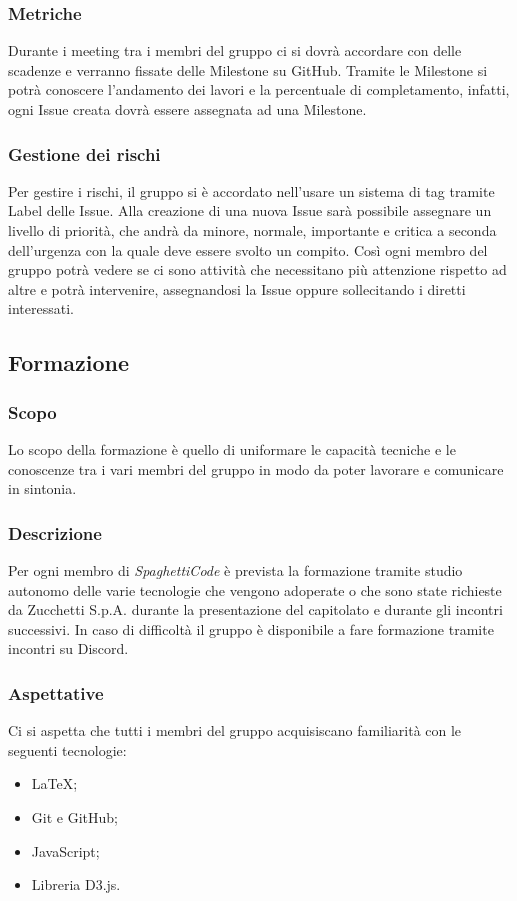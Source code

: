 \documentclass[../norme_di_progetto.tex]{subfiles}
\begin{document}
    \subsubsection{Metriche}
    Durante i meeting tra i membri del gruppo ci si dovrà accordare con delle scadenze e verranno fissate delle Milestone su GitHub. Tramite le Milestone si potrà conoscere l'andamento dei lavori e la percentuale di completamento, infatti, ogni Issue creata dovrà essere assegnata ad una Milestone. 
    \subsubsection{Gestione dei rischi}
    Per gestire i rischi, il gruppo si è accordato nell'usare un sistema di tag tramite Label delle Issue. Alla creazione di una nuova Issue sarà possibile assegnare un livello di priorità, che andrà da minore, normale, importante e critica a seconda dell'urgenza con la quale deve essere svolto un compito. Così ogni membro del gruppo potrà vedere se ci sono attività che necessitano più attenzione rispetto ad altre e potrà intervenire, assegnandosi la Issue oppure sollecitando i diretti interessati.

\subsection{Formazione}
    \subsubsection{Scopo}
    Lo scopo della formazione è quello di uniformare le capacità tecniche e le conoscenze tra i vari membri del gruppo in modo da poter lavorare e comunicare in sintonia.
    \subsubsection{Descrizione}
    Per ogni membro di \emph{SpaghettiCode} è prevista la formazione tramite studio autonomo delle varie tecnologie che vengono adoperate o che sono state richieste da Zucchetti S.p.A. durante la presentazione del capitolato e durante gli incontri successivi. In caso di difficoltà il gruppo è disponibile a fare formazione tramite incontri su Discord.
    \subsubsection{Aspettative}
    Ci si aspetta che tutti i membri del gruppo acquisiscano familiarità con le seguenti tecnologie:
    \begin{itemize}
        \item \LaTeX;
        \item Git e GitHub;
        \item JavaScript;
        \item Libreria D3.js.
    \end{itemize}
\end{document}
